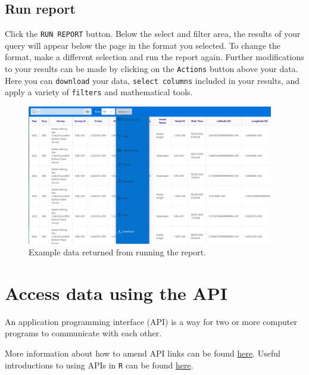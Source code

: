 \documentclass[
  letterpaper,
  oneside,
  open=any]{scrbook}
\begin{document}
\hypertarget{run-report}{%
\section{Run report}\label{run-report}}

Click the \texttt{RUN\ REPORT} button. Below the select and filter area,
the results of your query will appear below the page in the format you
selected. To change the format, make a different selection and run the
report again. Further modifications to your results can be made by
clicking on the \texttt{Actions} button above your data. Here you can
\texttt{download} your data, \texttt{select\ columns} included in your
results, and apply a variety of \texttt{filters} and mathematical tools.

\begin{figure}

{\centering \includegraphics[width=4.24in,height=\textheight]{content/../img/foss_5_run_report.png}

}

\caption{Example data returned from running the report.}

\end{figure}

\hypertarget{access-data-using-the-api}{%
\chapter{Access data using the API}\label{access-data-using-the-api}}

An application programming interface (API) is a way for two or more
computer programs to communicate with each other.

More information about how to amend API links can be found
\href{https://docs.oracle.com/en/database/oracle/oracle-rest-data-services/22.3/books.html\#AELIG90103/}{here}.
Useful introductions to using APIs in \texttt{R} can be found
\href{https://www.dataquest.io/blog/r-api-tutorial/}{here}.
\end{document}
